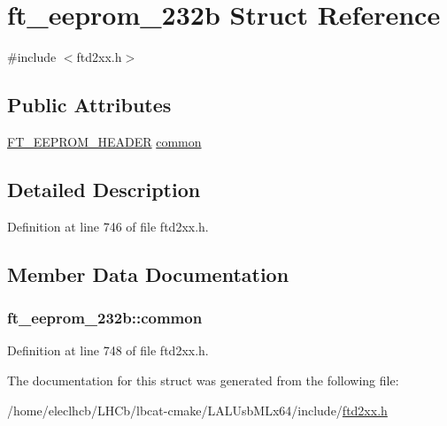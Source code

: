 \hypertarget{structft__eeprom__232b}{
\section{ft\_\-eeprom\_\-232b Struct Reference}
\label{structft__eeprom__232b}
}


{\ttfamily \#include $<$ftd2xx.h$>$}\subsection*{Public Attributes}
\begin{DoxyCompactItemize}
\item 
\hyperlink{structft__eeprom__header}{FT\_\-EEPROM\_\-HEADER} \hyperlink{structft__eeprom__232b_ad20111a2bbd898f3e5e8e0f780e8d7cf}{common}
\end{DoxyCompactItemize}


\subsection{Detailed Description}


Definition at line 746 of file ftd2xx.h.

\subsection{Member Data Documentation}
\hypertarget{structft__eeprom__232b_ad20111a2bbd898f3e5e8e0f780e8d7cf}{
\subsubsection[{common}]{ {\bf ft\_\-eeprom\_\-232b::common}}}
\label{structft__eeprom__232b_ad20111a2bbd898f3e5e8e0f780e8d7cf}


Definition at line 748 of file ftd2xx.h.

The documentation for this struct was generated from the following file:\begin{DoxyCompactItemize}
\item 
/home/eleclhcb/LHCb/lbcat-\/cmake/LALUsbMLx64/include/\hyperlink{LALUsbMLx64_2include_2ftd2xx_8h}{ftd2xx.h}\end{DoxyCompactItemize}
